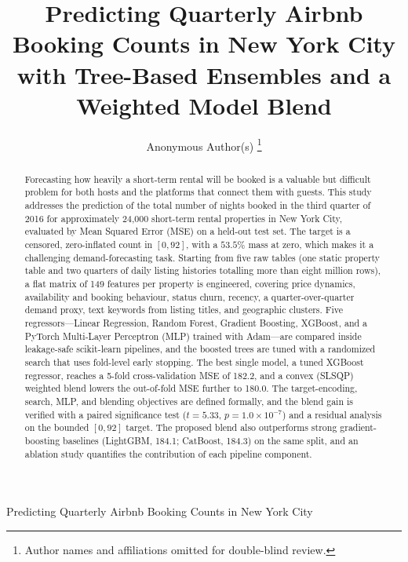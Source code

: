 \documentclass[journal]{IEEEtran}
\begin{document}
\title{Predicting Quarterly Airbnb Booking Counts in New York City with
Tree-Based Ensembles and a Weighted Model Blend}

\author{Anonymous Author(s)%
\thanks{Author names and affiliations omitted for double-blind review.}}

%
{Predicting Quarterly Airbnb Booking Counts in New York City}

\maketitle

\begin{abstract}
Forecasting how heavily a short-term rental will be booked is a valuable but
difficult problem for both hosts and the platforms that connect them with
guests. This study addresses the prediction of the total number of nights booked
in the third quarter of 2016 for approximately 24{,}000 short-term rental
properties in New York City, evaluated by Mean Squared Error (MSE) on a held-out
test set. The target is a censored, zero-inflated count in $[0,92]$, with a
$53.5\%$ mass at zero, which makes it a challenging demand-forecasting task.
Starting from five raw tables (one static property table and two quarters of
daily listing histories totalling more than eight million rows), a flat matrix
of 149 features per property is engineered, covering price dynamics, availability
and booking behaviour, status churn, recency, a quarter-over-quarter demand
proxy, text keywords from listing titles, and geographic clusters. Five
regressors---Linear Regression, Random Forest, Gradient Boosting, XGBoost, and a
PyTorch Multi-Layer Perceptron (MLP) trained with Adam---are compared inside
leakage-safe scikit-learn pipelines, and the boosted trees are tuned with a
randomized search that uses fold-level early stopping. The best single model, a
tuned XGBoost regressor, reaches a 5-fold cross-validation MSE of 182.2, and a
convex (SLSQP) weighted blend lowers the out-of-fold MSE further to 180.0. The
target-encoding, search, MLP, and blending objectives are defined formally, and
the blend gain is verified with a paired significance test
($t=5.33$, $p=1.0\times10^{-7}$) and a residual analysis on the bounded $[0,92]$
target. The proposed blend also outperforms strong gradient-boosting baselines
(LightGBM, 184.1; CatBoost, 184.3) on the same split, and an ablation study
quantifies the contribution of each pipeline component.
\end{abstract}
\end{document}

